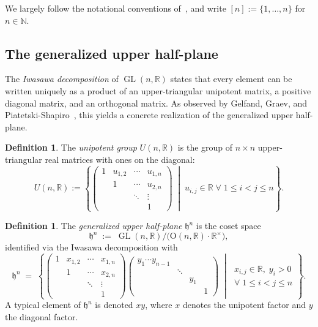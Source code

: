 \documentclass[12pt, reqno, oneside]{amsart}
\theoremstyle{definition}
\newtheorem{definition}[theorem]{Definition}
\numberwithin{equation}{section}
\newcommand{\N}{\mathbb{N}}
\newcommand{\R}{\mathbb{R}}
\newcommand{\hh}{\mathfrak{h}}
\DeclareMathOperator{\GL}{GL}
\begin{document}
We largely follow the notational conventions of~\cite{Gol06}, and write
$[n]:=\{1,\ldots,n\}$ for $n\in\N$.

\subsection{The generalized upper half-plane}

The \emph{Iwasawa decomposition} of $\GL(n,\R)$ states that every element
can be written uniquely as a product of an upper-triangular unipotent
matrix, a positive diagonal matrix, and an orthogonal matrix. As observed
by Gelfand, Graev, and Piatetski-Shapiro~\cite{GGP69}, this yields a
concrete realization of the generalized upper half-plane.

\begin{definition}
The \emph{unipotent group} $U(n,\R)$ is the group of $n\times n$
upper-triangular real matrices with ones on the diagonal:
\[
  U(n,\R) := \left\{
    \begin{pmatrix}
      1 & u_{1,2} & \cdots & u_{1,n} \\
        & 1       & \cdots & u_{2,n} \\
        &         & \ddots & \vdots  \\
        &         &        & 1
    \end{pmatrix}
    \;\middle|\;
    u_{i,j}\in\R \;\forall\; 1\leq i<j\leq n
  \right\}.
\]
\end{definition}

\begin{definition}
The \emph{generalized upper half-plane} $\hh^n$ is the coset space
\[
  \hh^n \;:=\; \GL(n,\R)\big/\bigl(\mathrm{O}(n,\R)\cdot\R^\times\bigr),
\]
identified via the Iwasawa decomposition with
\[
  \hh^n \;=\;
  \left\{
    \begin{pmatrix}
      1 & x_{1,2} & \cdots & x_{1,n} \\
        & 1       & \cdots & x_{2,n} \\
        &         & \ddots & \vdots  \\
        &         &        & 1
    \end{pmatrix}
    \begin{pmatrix}
      y_1 \cdots y_{n-1} & & & \\
      & \ddots & & \\
      & & y_1 & \\
      & & & 1
    \end{pmatrix}
    \;\middle|\;
    \begin{array}{l}
      x_{i,j}\in\R,\; y_i>0 \\
      \forall\; 1\leq i<j\leq n
    \end{array}
  \right\}.
\]
A typical element of $\hh^n$ is denoted $xy$, where $x$ denotes the
unipotent factor and $y$ the diagonal factor.
\end{definition}
\end{document}
